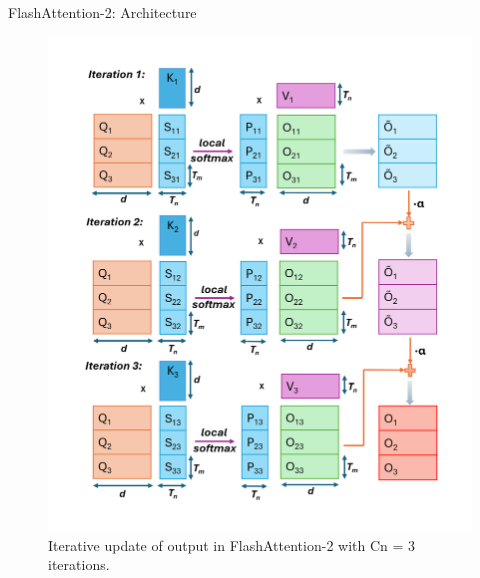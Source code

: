 \begin{frame}[allowframebreaks]{FlashAttention-2: Architecture}
\begin{figure}
        \centering
        \includegraphics[height=0.82\textheight,width=\textwidth,keepaspectratio]{images/recent-advance/flash-attention-2-iterative-update.png}
        \caption*{Iterative update of output in FlashAttention-2 with Cn = 3 iterations.}
    \end{figure}
\end{frame}

